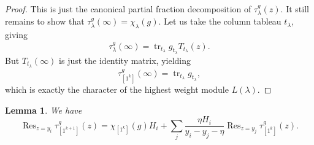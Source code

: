 \documentclass[11pt]{report}
\newtheorem{lemma}[theorem]{Lemma}
\theoremstyle{definition}
\theoremstyle{remark}
\theoremstyle{remark}
\begin{document}
\begin{proof}
This is just the canonical partial fraction decomposition of $\tau_\lambda^g(z)$. It still remains to show that $\tau_\lambda^g(\infty) = \chi_\lambda(g)$. Let us take the column tableau $t_\lambda$, giving
\begin{equation*}
\tau_\lambda^g(\infty) = \operatorname{tr}_{t_\lambda} g_{t_\lambda} T_{t_\lambda}(z).
\end{equation*}
But $T_{t_\lambda}(\infty)$ is just the identity matrix, yielding
\begin{equation*}
\tau_{[1^k]}^g(\infty) = \operatorname{tr}_{t_\lambda} g_{t_\lambda},
\end{equation*}
which is exactly the character of the highest weight module $L(\lambda)$.
\end{proof}

\begin{lemma}
We have
\begin{equation*}
\operatorname{Res}_{z=y_i} \tau_{[1^{k+1}]}^g(z)
= \chi_{[1^k]}(g) H_i + \sum_j \frac{\eta H_i}{y_i-y_j-\eta} \operatorname{Res}_{z=y_j} \tau_{[1^k]}^g(z).
\end{equation*}
\end{lemma}
\end{document}
